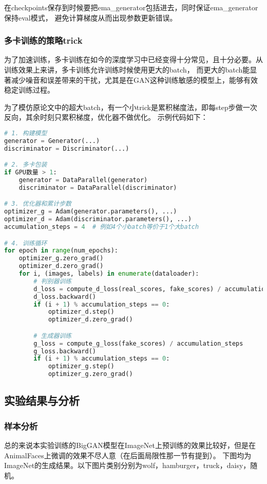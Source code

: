 \documentclass[12pt, a4paper]{article}
\begin{document}
\vspace{1cm}
在checkpoints保存到时候要把ema\_generator包括进去，同时保证ema\_generator保持eval模式，
避免计算梯度从而出现参数更新错误。

\subsubsection{多卡训练的策略trick}

为了加速训练，多卡训练在如今的深度学习中已经变得十分常见，且十分必要。从训练效果上来讲，多卡训练允许训练时候使用更大的batch，
而更大的batch能显著减少噪音和误差带来的干扰，尤其是在GAN这种训练敏感的模型上，能够有效稳定训练过程。

为了模仿原论文中的超大batch，有一个小trick是累积梯度法，即每step步做一次反向，其余时刻只累积梯度，优化器不做优化。
示例代码如下：
\begin{lstlisting}[language=python]
# 1. 构建模型
generator = Generator(...)
discriminator = Discriminator(...)

# 2. 多卡包装
if GPU数量 > 1:
    generator = DataParallel(generator)
    discriminator = DataParallel(discriminator)

# 3. 优化器和累计步数
optimizer_g = Adam(generator.parameters(), ...)
optimizer_d = Adam(discriminator.parameters(), ...)
accumulation_steps = 4  # 例如4个小batch等价于1个大batch

# 4. 训练循环
for epoch in range(num_epochs):
    optimizer_g.zero_grad()
    optimizer_d.zero_grad()
    for i, (images, labels) in enumerate(dataloader):
        # 判别器训练
        d_loss = compute_d_loss(real_scores, fake_scores) / accumulation_steps
        d_loss.backward()
        if (i + 1) % accumulation_steps == 0:
            optimizer_d.step()
            optimizer_d.zero_grad()

        # 生成器训练
        g_loss = compute_g_loss(fake_scores) / accumulation_steps
        g_loss.backward()
        if (i + 1) % accumulation_steps == 0:
            optimizer_g.step()
            optimizer_g.zero_grad()
\end{lstlisting}

\newpage
\subsection{实验结果与分析}
\subsubsection{样本分析}
总的来说本实验训练的BigGAN模型在ImageNet上预训练的效果比较好，但是在AnimalFaces上微调的效果不尽人意（在后面局限性那一节有提到）。
下图均为ImageNet的生成结果。以下图片类别分别为wolf，hamburger，truck，daisy，随机。
\vspace{1cm}
\end{document}

